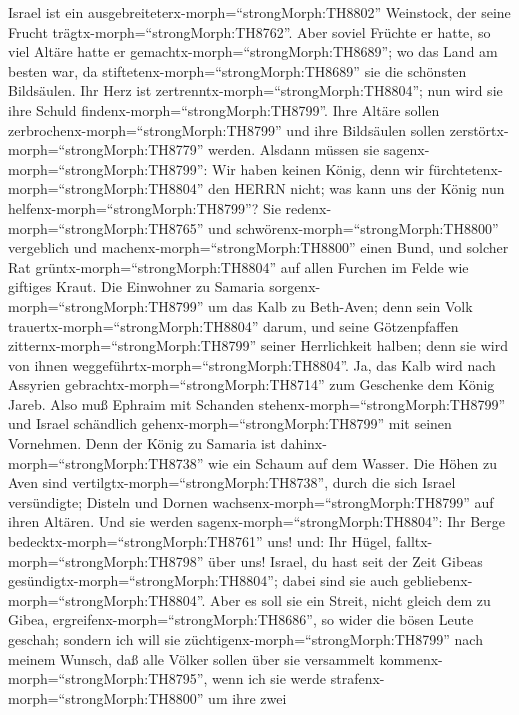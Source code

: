  Israel ist ein ausgebreiteterx-morph=``strongMorph:TH8802''
Weinstock, der seine Frucht trägtx-morph=``strongMorph:TH8762''. Aber
soviel Früchte er hatte, so viel Altäre hatte er
gemachtx-morph=``strongMorph:TH8689''; wo das Land am besten war, da
stiftetenx-morph=``strongMorph:TH8689'' sie die schönsten Bildsäulen.
 Ihr Herz ist zertrenntx-morph=``strongMorph:TH8804''; nun
wird sie ihre Schuld findenx-morph=``strongMorph:TH8799''. Ihre Altäre
sollen zerbrochenx-morph=``strongMorph:TH8799'' und ihre Bildsäulen
sollen zerstörtx-morph=``strongMorph:TH8779'' werden. 
Alsdann müssen sie sagenx-morph=``strongMorph:TH8799'': Wir haben keinen
König, denn wir fürchtetenx-morph=``strongMorph:TH8804'' den HERRN
nicht; was kann uns der König nun helfenx-morph=``strongMorph:TH8799''?
 Sie redenx-morph=``strongMorph:TH8765'' und
schwörenx-morph=``strongMorph:TH8800'' vergeblich und
machenx-morph=``strongMorph:TH8800'' einen Bund, und solcher Rat
grüntx-morph=``strongMorph:TH8804'' auf allen Furchen im Felde wie
giftiges Kraut.  Die Einwohner zu Samaria
sorgenx-morph=``strongMorph:TH8799'' um das Kalb zu Beth-Aven; denn sein
Volk trauertx-morph=``strongMorph:TH8804'' darum, und seine
Götzenpfaffen zitternx-morph=``strongMorph:TH8799'' seiner Herrlichkeit
halben; denn sie wird von ihnen
weggeführtx-morph=``strongMorph:TH8804''.  Ja, das Kalb wird
nach Assyrien gebrachtx-morph=``strongMorph:TH8714'' zum Geschenke dem
König Jareb. Also muß Ephraim mit Schanden
stehenx-morph=``strongMorph:TH8799'' und Israel schändlich
gehenx-morph=``strongMorph:TH8799'' mit seinen Vornehmen. 
Denn der König zu Samaria ist dahinx-morph=``strongMorph:TH8738'' wie
ein Schaum auf dem Wasser.  Die Höhen zu Aven sind
vertilgtx-morph=``strongMorph:TH8738'', durch die sich Israel
versündigte; Disteln und Dornen wachsenx-morph=``strongMorph:TH8799''
auf ihren Altären. Und sie werden sagenx-morph=``strongMorph:TH8804'':
Ihr Berge bedecktx-morph=``strongMorph:TH8761'' uns! und: Ihr Hügel,
falltx-morph=``strongMorph:TH8798'' über uns!  Israel, du
hast seit der Zeit Gibeas gesündigtx-morph=``strongMorph:TH8804''; dabei
sind sie auch gebliebenx-morph=``strongMorph:TH8804''. Aber es soll sie
ein Streit, nicht gleich dem zu Gibea,
ergreifenx-morph=``strongMorph:TH8686'', so wider die bösen Leute
geschah;  sondern ich will sie
züchtigenx-morph=``strongMorph:TH8799'' nach meinem Wunsch, daß alle
Völker sollen über sie versammelt kommenx-morph=``strongMorph:TH8795'',
wenn ich sie werde strafenx-morph=``strongMorph:TH8800'' um ihre zwei
